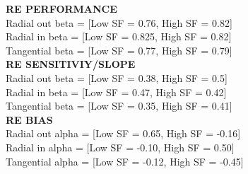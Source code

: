 \documentclass[11pt]{article} %
\begin{document}
\textbf{RE PERFORMANCE}
\\
Radial out beta = [Low SF = 0.76, High SF = 0.82]
\\
Radial in beta = [Low SF = 0.825, High SF = 0.82]
\\
Tangential beta = [Low SF = 0.77, High SF = 0.79]
\\
\textbf{RE SENSITIVIY/SLOPE}
\\
Radial out beta = [Low SF = 0.38, High SF = 0.5]
\\
Radial in beta = [Low SF = 0.47, High SF = 0.42]
\\
Tangential beta = [Low SF = 0.35, High SF = 0.41]
\\
\textbf{RE BIAS}
\\
Radial out alpha = [Low SF = 0.65, High SF = -0.16]
\\
Radial in alpha = [Low SF = -0.10, High SF = 0.50]
\\
Tangential alpha = [Low SF = -0.12, High SF = -0.45]


\newpage
\end{document}
